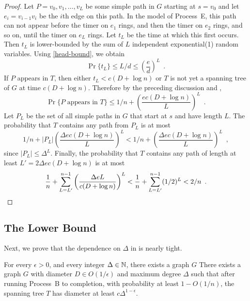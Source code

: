 \documentclass{patmorin}
\begin{document}
\begin{proof}
  Let $P=v_0,v_1,\ldots,v_L$ be some simple path in $G$ starting at
  $s=v_0$ and let $e_i=v_{i-1}v_i$ be the $i$th edge on this path.
  In the model of Process~E, this path can not appear before the timer
  on $e_1$ rings, and then the timer on $e_2$ rings, and so on, until the
  timer on $e_L$ rings.  Let $t_L$ be the time at which this first occurs.
  Then $t_L$ is lower-bounded by the sum of $L$ independent exponential(1)
  random variables.  Using \eqref{head-bound}, we obtain
  \[
      \Pr\{t_L\} \le L/d \le \left(\frac{e}{d}\right)^L \enspace .
  \]
  If $P$ appears in $T$, then either $t_L < c(D+\log n)$ or $T$ is not
  yet a spanning tree of $G$ at time $c(D+\log n)$.  
  Therefore by the preceding discussion and , 
  \[
      \Pr\{\text{$P$ appears in $T$}\} \le 1/n 
        + \left(\frac{ec(D+\log n)}{L}\right)^L \enspace .
  \]
  Let $P_L$ be the set of all simple paths in $G$ that start at $s$ and have length $L$.  The probability that $T$ contains any path from $P_L$ is at most
  \[
      1/n + |P_L|\left(\frac{\Delta ec(D+\log n)}{L}\right)^L 
      < 1/n + \left(\frac{\Delta ec(D+\log n)}{L}\right)^L \enspace ,
  \]
  since $|P_L|\le \Delta^L$.
  Finally, the probability that $T$ contains any path of length at least
  $L'=2\Delta ec(D+\log n)$ is at most
  \[
     \frac{1}{n}+\sum_{L=L'}^{n-1} \left(\frac{\Delta e L}{c(D+\log n)}\right)^L <  \frac{1}{n}+\sum_{L=L'}^{n-1} (1/2)^L < 2/n \enspace . \qedhere
  \]
\end{proof}

\subsection{The Lower Bound}

Next, we prove that the dependence on $\Delta$ in  is nearly tight.

\begin{lem}
  For every $\epsilon >0$, and every integer $\Delta\in \mathbb{N}$, there
  exists a graph $G$ There exists a graph $G$ with diameter $D\in
  O(1/\epsilon)$ and maximum degree $\Delta$ such that after running
  Process~B to completion, with probability at least $1-O(1/n)$, the
  spanning tree $T$ has diameter at least $c\Delta^{1-\epsilon}$.
\end{lem}
\end{document}
